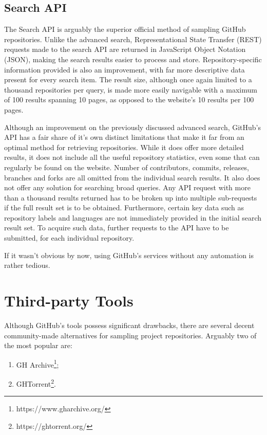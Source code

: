 \newpage
\subsection{Search API}

The Search API is arguably the superior official method of sampling GitHub repositories.
Unlike the advanced search, Representational State Transfer (REST) requests made to the search API are returned in JavaScript Object Notation (JSON), making the search results easier to process and store.
Repository-specific information provided is also an improvement, with far more descriptive data present for every search item.
The result size, although once again limited to a thousand repositories per query, is made more easily navigable with a maximum of 100 results spanning 10 pages, as opposed to the website's 10 results per 100 pages.

Although an improvement on the previously discussed advanced search, GitHub's API has a fair share of it's own distinct limitations that make it far from an optimal method for retrieving repositories.
While it does offer more detailed results, it does not include all the useful repository statistics, even some that can regularly be found on the website.
Number of contributors, commits, releases, branches and forks are all omitted from the individual search results.
It also does not offer any solution for searching broad queries.
Any API request with more than a thousand results returned has to be broken up into multiple sub-requests if the full result set is to be obtained.
Furthermore, certain key data such as repository labels and languages are not immediately provided in the initial search result set.
To acquire such data, further requests to the API have to be submitted, for each individual repository.

If it wasn't obvious by now, using GitHub's services without any automation is rather tedious.

\section{Third-party Tools}

Although GitHub's tools possess significant drawbacks, there are several decent community-made alternatives for sampling project repositories.
Arguably two of the most popular are:
\begin{enumerate}
    \item GH Archive\footnote{https://www.gharchive.org/};
    \item GHTorrent\footnote{https://ghtorrent.org/}.
\end{enumerate}

